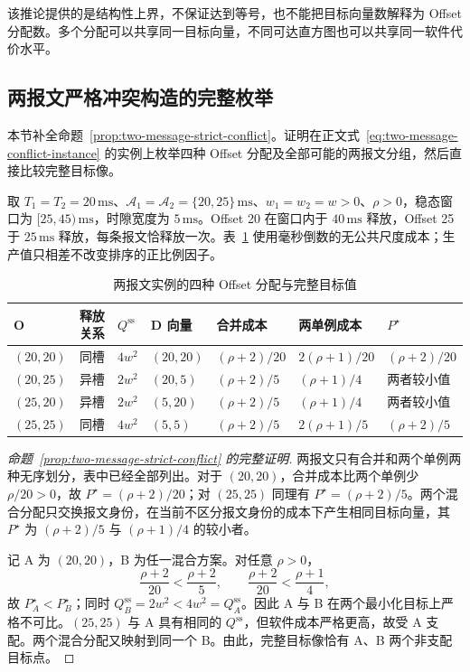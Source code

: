 \documentclass[UTF8,a4paper,twoside,zihao=-4]{ctexart}
\numberwithin{equation}{section}
\numberwithin{figure}{section}
\numberwithin{table}{section}
\theoremstyle{definition}
\newcommand{\Oset}{\mathcal{A}}
\numberwithin{algocf}{section}
\begin{document}
该推论提供的是结构性上界，不保证达到等号，也不能把目标向量数解释为 Offset 分配数。多个分配可以共享同一目标向量，不同可达直方图也可以共享同一软件代价水平。

\subsection{两报文严格冲突构造的完整枚举}
\label{subsec:appendix-two-message-conflict-proof}

本节补全命题~\ref{prop:two-message-strict-conflict}。证明在正文式~\eqref{eq:two-message-conflict-instance} 的实例上枚举四种 Offset 分配及全部可能的两报文分组，然后直接比较完整目标像。

取 $T_1=T_2=20\,\mathrm{ms}$、$\Oset_1=\Oset_2=\{20,25\}\,\mathrm{ms}$、$w_1=w_2=w>0$、$\rho>0$，稳态窗口为 $[25,45)\,\mathrm{ms}$，时隙宽度为 $5\,\mathrm{ms}$。Offset 20 在窗口内于 $40\,\mathrm{ms}$ 释放，Offset 25 于 $25\,\mathrm{ms}$ 释放，每条报文恰释放一次。表~\ref{tab:appendix-two-message-enumeration} 使用毫秒倒数的无公共尺度成本；生产值只相差不改变排序的正比例因子。

\begin{table}[htbp]
\centering
\caption{两报文实例的四种 Offset 分配与完整目标值}
\label{tab:appendix-two-message-enumeration}
\scriptsize
\setlength{\tabcolsep}{3.2pt}
\begin{tabular}{@{}lclllll@{}}
\toprule
$\boldsymbol O$ & 释放关系 & $Q^{\mathrm{ss}}$ & D 向量 & 合并成本 & 两单例成本 & $P^\star$ \\
\midrule
$(20,20)$ & 同槽 & $4w^2$ & $(20,20)$ & $(\rho+2)/20$ & $2(\rho+1)/20$ & $(\rho+2)/20$ \\
$(20,25)$ & 异槽 & $2w^2$ & $(20,5)$ & $(\rho+2)/5$ & $(\rho+1)/4$ & 两者较小值 \\
$(25,20)$ & 异槽 & $2w^2$ & $(5,20)$ & $(\rho+2)/5$ & $(\rho+1)/4$ & 两者较小值 \\
$(25,25)$ & 同槽 & $4w^2$ & $(5,5)$ & $(\rho+2)/5$ & $2(\rho+1)/5$ & $(\rho+2)/5$ \\
\bottomrule
\end{tabular}
\end{table}

\begin{proof}[命题~\ref{prop:two-message-strict-conflict} 的完整证明]
两报文只有合并和两个单例两种无序划分，表中已经全部列出。对于 $(20,20)$，合并成本比两个单例少 $\rho/20>0$，故 $P^\star=(\rho+2)/20$；对 $(25,25)$ 同理有 $P^\star=(\rho+2)/5$。两个混合分配只交换报文身份，在当前不区分报文身份的成本下产生相同目标向量，其 $P^\star$ 为 $(\rho+2)/5$ 与 $(\rho+1)/4$ 的较小者。

记 A 为 $(20,20)$，B 为任一混合方案。对任意 $\rho>0$，
\begin{equation}
 \frac{\rho+2}{20}<\frac{\rho+2}{5},
 \qquad
 \frac{\rho+2}{20}<\frac{\rho+1}{4},
\label{eq:appendix-two-message-pstar-order}
\end{equation}
故 $P_A^\star<P_B^\star$；同时 $Q_B^{\mathrm{ss}}=2w^2<4w^2=Q_A^{\mathrm{ss}}$。因此 A 与 B 在两个最小化目标上严格不可比。$(25,25)$ 与 A 具有相同的 $Q^{\mathrm{ss}}$，但软件成本严格更高，故受 A 支配。两个混合分配又映射到同一个 B。由此，完整目标像恰有 A、B 两个非支配目标点。
\end{proof}
\end{document}
